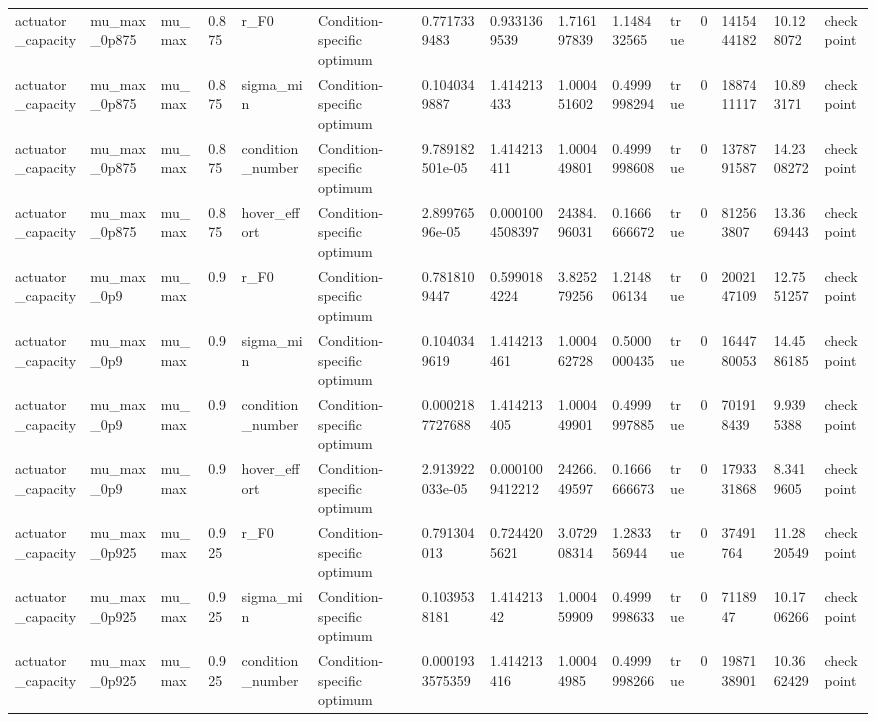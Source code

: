 \begin{tabular}{@{}lllllllllllllll@{}}
actuator\_capacity & mu\_max\_0p875 & mu\_max & 0.875 & r\_F0 & Condition-specific optimum & 0.7717339483 & 0.9331369539 & 1.716197839 & 1.148432565 & true & 0 & 1415444182 & 10.128072 & checkpoint \\
actuator\_capacity & mu\_max\_0p875 & mu\_max & 0.875 & sigma\_min & Condition-specific optimum & 0.1040349887 & 1.414213433 & 1.000451602 & 0.4999998294 & true & 0 & 1887411117 & 10.893171 & checkpoint \\
actuator\_capacity & mu\_max\_0p875 & mu\_max & 0.875 & condition\_number & Condition-specific optimum & 9.789182501e-05 & 1.414213411 & 1.000449801 & 0.4999998608 & true & 0 & 1378791587 & 14.2308272 & checkpoint \\
actuator\_capacity & mu\_max\_0p875 & mu\_max & 0.875 & hover\_effort & Condition-specific optimum & 2.89976596e-05 & 0.0001004508397 & 24384.96031 & 0.1666666672 & true & 0 & 812563807 & 13.3669443 & checkpoint \\
actuator\_capacity & mu\_max\_0p9 & mu\_max & 0.9 & r\_F0 & Condition-specific optimum & 0.7818109447 & 0.5990184224 & 3.825279256 & 1.214806134 & true & 0 & 2002147109 & 12.7551257 & checkpoint \\
actuator\_capacity & mu\_max\_0p9 & mu\_max & 0.9 & sigma\_min & Condition-specific optimum & 0.1040349619 & 1.414213461 & 1.000462728 & 0.5000000435 & true & 0 & 1644780053 & 14.4586185 & checkpoint \\
actuator\_capacity & mu\_max\_0p9 & mu\_max & 0.9 & condition\_number & Condition-specific optimum & 0.0002187727688 & 1.414213405 & 1.000449901 & 0.4999997885 & true & 0 & 701918439 & 9.9395388 & checkpoint \\
actuator\_capacity & mu\_max\_0p9 & mu\_max & 0.9 & hover\_effort & Condition-specific optimum & 2.913922033e-05 & 0.0001009412212 & 24266.49597 & 0.1666666673 & true & 0 & 1793331868 & 8.3419605 & checkpoint \\
actuator\_capacity & mu\_max\_0p925 & mu\_max & 0.925 & r\_F0 & Condition-specific optimum & 0.791304013 & 0.7244205621 & 3.072908314 & 1.283356944 & true & 0 & 37491764 & 11.2820549 & checkpoint \\
actuator\_capacity & mu\_max\_0p925 & mu\_max & 0.925 & sigma\_min & Condition-specific optimum & 0.1039538181 & 1.41421342 & 1.000459909 & 0.4999998633 & true & 0 & 7118947 & 10.1706266 & checkpoint \\
actuator\_capacity & mu\_max\_0p925 & mu\_max & 0.925 & condition\_number & Condition-specific optimum & 0.0001933575359 & 1.414213416 & 1.00044985 & 0.4999998266 & true & 0 & 1987138901 & 10.3662429 & checkpoint \\

\end{tabular}
